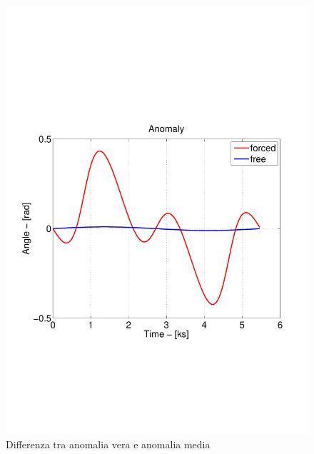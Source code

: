\begin{figure}[h]
\begin{center}
  \includegraphics[width=\textwidth,clip=true,trim=1cm 6.5cm 1cm 8cm]
  {modelling/orbit_dynamics/image/anomaly.pdf}
  \caption{Differenza tra anomalia vera e anomalia media}
\end{center}
\end{figure}

